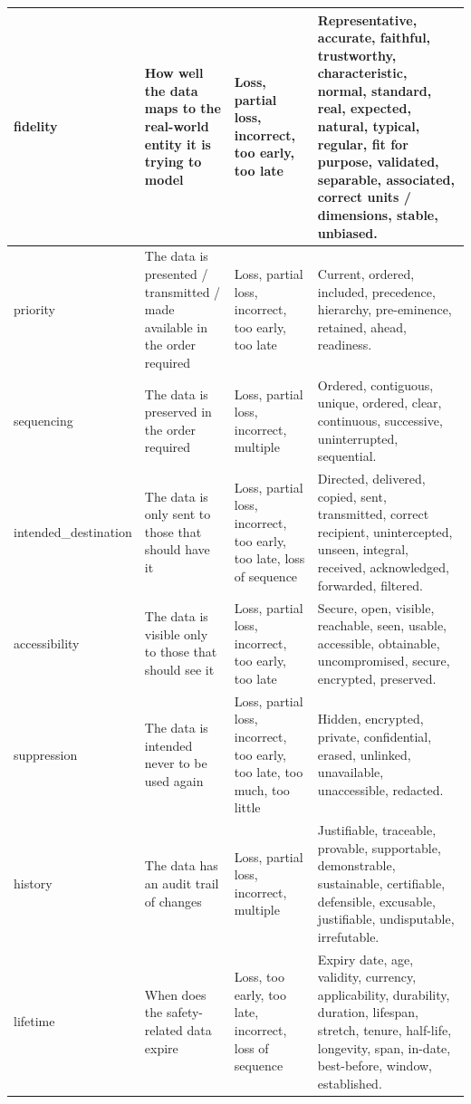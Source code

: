 \begin{longtable}{|L{}|L{}|L{}|L{}|}
  \hline
{}\Gls{fidelity} & How well the data maps to the real-world entity it is trying to model & Loss, partial loss, incorrect, too early, too late & Representative, accurate, faithful, trustworthy, characteristic, normal, standard, real, expected, natural, typical, regular, fit for purpose, validated, separable, associated, correct units / dimensions, stable, unbiased.\\
  \hline
  \Gls{priority} & The data is presented / transmitted / made available in the order required & Loss, partial loss, incorrect, too early, too late & Current, ordered, included, precedence, hierarchy, pre-eminence, retained, ahead, readiness.\\
  \hline
  \Gls{sequencing} & The data is preserved in the order required & Loss, partial loss, incorrect, multiple & Ordered, contiguous, unique, ordered, clear, continuous, successive, uninterrupted, sequential.\\
  \hline
  \Gls{intended_destination} & The data is only sent to those that should have it & Loss, partial loss, incorrect, too early, too late, loss of sequence & Directed, delivered, copied, sent, transmitted, correct recipient, unintercepted, unseen, integral, received, acknowledged, forwarded, filtered.\\
  \hline
  \Gls{accessibility} & The data is visible only to those that should see it & Loss, partial loss, incorrect, too early, too late & Secure, open, visible, reachable, seen, usable, accessible, obtainable, uncompromised, secure, encrypted, preserved.\\
  \hline
  \Gls{suppression} & The data is intended never to be used again & Loss, partial loss, incorrect, too early, too late, too much, too little & Hidden, encrypted, private, confidential, erased, unlinked, unavailable, unaccessible, redacted.\\
  \hline
  \Gls{history} & The data has an audit trail of changes & Loss, partial loss, incorrect, multiple & Justifiable, traceable, provable, supportable, demonstrable, sustainable, certifiable, defensible, excusable, justifiable, undisputable, irrefutable.\\
  \hline
  \Gls{lifetime} & When does the safety-related data expire & Loss, too early, too late, incorrect, loss of sequence & Expiry date, age, \gls{validity}, currency, applicability, durability, duration, lifespan, stretch, tenure, half-life, longevity, span, in-date, best-before, window, established.\\

\end{longtable}
